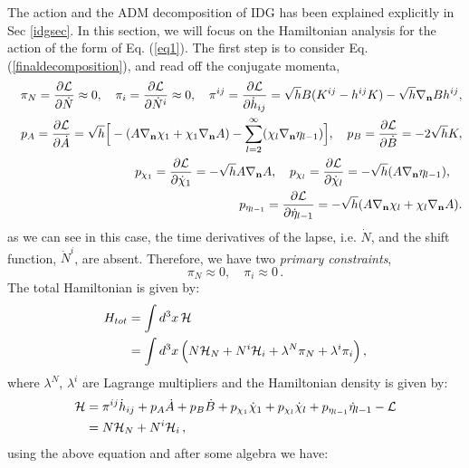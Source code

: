 \documentclass[a4paper,12pt]{article}
\newcommand{\bn}{\bold{n}}
\newcommand{\la}{\lambda}
\newcommand{\cH}{{\cal H}}
\newcommand{\cL}{{\cal L}}
\newcommand{\+}{^{\dagger}}
\newcommand{\p}{\partial}
\newcommand{\2}{\frac{1}{2}}
\newcommand{\3}{\frac{1}{3}}
\newcommand{\4}{\frac{1}{4}}
\newcommand{\6}{\frac{1}{6}}
\newcommand{\8}{\frac{1}{8}}
\begin{document}
The action and the ADM decomposition of IDG has been explained explicitly in Sec \ref{idgsec}. In this section, we will
focus on the Hamiltonian analysis for the action of the form of Eq. (\ref{eq1}). The first step is to consider Eq. (\ref{finaldecomposition}),
and read off the conjugate momenta,  
\begin{eqnarray}
&&\pi_N=\frac{\p \cL}{\p \dot{N}}\approx0,\quad\pi_i=\frac{\p \cL}{\p \dot{N}^i}\approx0, \quad \pi^{ij}=\frac{\partial\mathcal{L}}{\partial\dot{h}_{ij}}=\sqrt{h}B(K^{ij}-h^{ij}K)-\sqrt{h}\nabla_\bn Bh^{ij},\nonumber\\
&&p_A=\frac{\partial\mathcal{L}}{\partial\dot{A}}=\sqrt{h}\Big[-(A\nabla_\bn \chi_1  +\chi_1
\nabla_\bn A)-\sum^{\infty}_{l=2}(\chi_l
\nabla_\bn \eta_{l-1})\Big],\quad p_B=\frac{\partial\mathcal{L}}{\partial\dot{B}}=-2\sqrt{h}K,\nonumber\\
&&p_{\chi_1}=\frac{\partial\mathcal{L}}{\partial\dot{\chi}_1}=-\sqrt{h}A\nabla_\bn A,\quad p_{\chi_l}=\frac{\partial\mathcal{L}}{\partial\dot{\chi}_l}=-\sqrt{h}(A\nabla_\bn \eta_{l-1}),\quad\nonumber\\
&&p_{\eta_{l-1}}=\frac{\partial\mathcal{L}}{\partial\dot{\eta}_{l-1}}=-\sqrt{h}(A\nabla_\bn \chi_l
+\chi_l
\nabla_\bn A).
\end{eqnarray}
as we can see in this case, the time derivatives of the lapse, i.e. $\dot N$, and the shift function, $\dot N^i$, are absent. Therefore, we have two {\it primary constraints}, 
\begin{equation}
\pi_N\approx0, \quad \pi_i\approx0\,.
\end{equation}
The total Hamiltonian is given by:
\begin{align}
H_{tot}&=\int d^{3}x \, \cH \\ \label{wowo}
&=\int d^{3}x \, \Big(N\mathcal{H}_N+N^i\cH_i+\la^{N}\pi_{N}+\la^{i}\pi_{i}\Big)\,,
\end{align}
where $\la^N$, $\la^i$ are Lagrange multipliers and the Hamiltonian density is given by: 
\begin{align}\label{Hamilton-IDG}
\mathcal{H}&=\pi^{ij}\dot{h}_{ij}+p_A\dot{A}+p_B\dot{B}+p_{\chi_1}\dot{\chi}_1+p_{\chi_l}\dot{\chi}_l+p_{\eta_{l-1}}\dot{\eta}_{l-1}-\mathcal{L}\\
&=N\mathcal{H}_N+N^i\cH_i\,,
\end{align}
using the above equation and after some algebra we have: 
\end{document}
